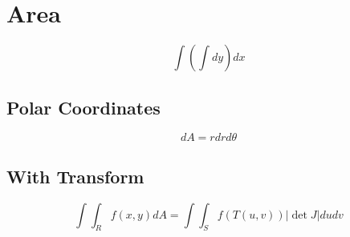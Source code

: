 \section{Area}

  \begin{equation}
    \int \left( \int dy \right) dx
  \end{equation}

  \subsection{Polar Coordinates}

    \begin{equation}
      dA = r dr d\theta
    \end{equation}

  \subsection{With Transform}

    \begin{equation}
      \int \int_{R} f\left( x, y \right) dA
        = \int \int_{S} f\left( T\left( u, v \right) \right) \left| \det J \right| du dv
    \end{equation}